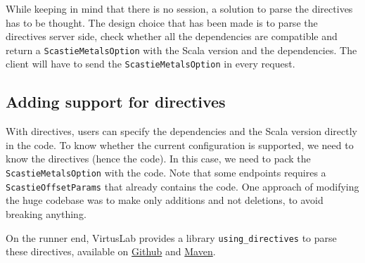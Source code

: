 \documentclass{article}
\begin{document}
While keeping in mind that there is no session, a solution to parse the directives has to be thought. The design choice that has been made is to parse the directives server side, check whether all the dependencies are compatible and return a \lstinline{ScastieMetalsOption} with the Scala version and the dependencies. The client will have to send the \lstinline{ScastieMetalsOption} in every request.

\subsection{Adding support for directives}

With directives, users can specify the dependencies and the Scala version directly in the code. To know whether the current configuration is supported, we need to know the directives (hence the code). In this case, we need to pack the \lstinline{ScastieMetalsOption} with the code. Note that some endpoints requires a \lstinline{ScastieOffsetParams} that already contains the code. One approach of modifying the huge codebase was to make only additions and not deletions, to avoid breaking anything.





On the runner end, VirtusLab provides a library \lstinline{using_directives} to parse these directives, available on \href{https://github.com/VirtusLab/using_directives}{Github} and \href{https://mvnrepository.com/artifact/org.virtuslab.scala-cli/directives_3}{Maven}.
\end{document}
